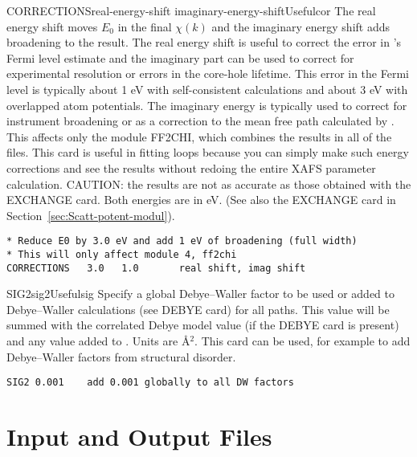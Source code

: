 \documentclass[11pt,oneside]{report} %
\begin{document}
\begin{Card}{CORRECTIONS}{real-energy-shift imaginary-energy-shift}{Useful}{cor}
  The real energy shift moves $E_0$ in the final $\chi(k)$ and the
  imaginary energy shift adds broadening to the result.  The real
  energy shift is useful to correct the error in {\feff}'s Fermi
  level estimate and the imaginary part can be used to correct
  for experimental resolution or errors in the core-hole lifetime.
  This error in the Fermi level is typically about 1 eV with self-consistent
  calculations and about 3 eV with overlapped atom potentials.  The imaginary
  energy is typically used to correct for instrument broadening or as
  a correction to the mean free path calculated by {\feff}. This
  affects only the module FF2CHI, which combines the results in all of
  the  files.  This card is useful in fitting loops
  because you can simply make such energy corrections and see the results
  without redoing the entire XAFS parameter calculation. CAUTION: the
  results are not as accurate as those obtained with the EXCHANGE card.
  Both energies are in eV.
  (See also the EXCHANGE card in Section~\ref{sec:Scatt-potent-modul}).
\begin{verbatim}
* Reduce E0 by 3.0 eV and add 1 eV of broadening (full width)
* This will only affect module 4, ff2chi
CORRECTIONS   3.0   1.0       real shift, imag shift
\end{verbatim}
\end{Card}


\begin{Card}{SIG2}{sig2}{Useful}{sig}
  Specify a global Debye--Waller factor to be used or added to
  Debye--Waller calculations (see DEBYE card) for all paths.  This
  value will be summed with the correlated Debye model value (if the
  DEBYE card is present) and any value added to .  Units are
  \AA$^2$.  This card can be used, for example to add Debye--Waller
  factors from structural disorder.

\begin{verbatim}
SIG2 0.001    add 0.001 globally to all DW factors
\end{verbatim}
\end{Card}



\chapter{Input and Output Files}
\label{sec:Input-and-Output-Files}
\end{document}
